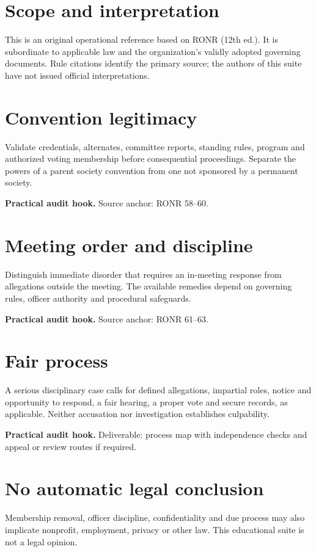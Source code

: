\documentclass[11pt]{article}
\begin{document}
\SuiteOpen
\section{Scope and interpretation}
This is an original operational reference based on RONR (12th ed.). It is subordinate to applicable law and the organization’s validly adopted governing documents. Rule citations identify the primary source; the authors of this suite have not issued official interpretations.

\section{Convention legitimacy}
Validate credentials, alternates, committee reports, standing rules, program and authorized voting membership before consequential proceedings. Separate the powers of a parent society convention from one not sponsored by a permanent society.

\textbf{Practical audit hook.} Source anchor: RONR 58--60.

\section{Meeting order and discipline}
Distinguish immediate disorder that requires an in-meeting response from allegations outside the meeting. The available remedies depend on governing rules, officer authority and procedural safeguards.

\textbf{Practical audit hook.} Source anchor: RONR 61--63.

\section{Fair process}
A serious disciplinary case calls for defined allegations, impartial roles, notice and opportunity to respond, a fair hearing, a proper vote and secure records, as applicable. Neither accusation nor investigation establishes culpability.

\textbf{Practical audit hook.} Deliverable: process map with independence checks and appeal or review routes if required.

\section{No automatic legal conclusion}
Membership removal, officer discipline, confidentiality and due process may also implicate nonprofit, employment, privacy or other law. This educational suite is not a legal opinion.
\end{document}
